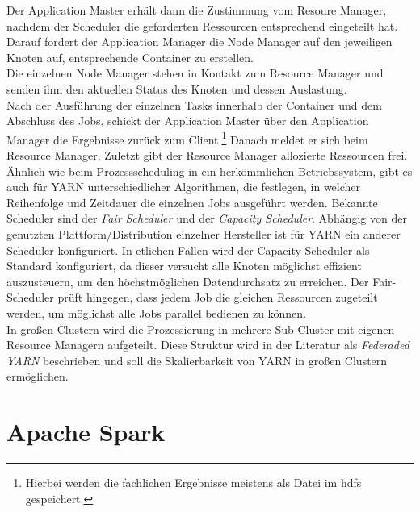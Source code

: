 \noindent
Der Application Master erhält dann die Zustimmung vom Resoure Manager, nachdem der Scheduler die geforderten Ressourcen entsprechend eingeteilt hat. Darauf fordert der Application Manager die Node Manager auf den jeweiligen Knoten auf, entsprechende Container zu erstellen.\\
Die einzelnen Node Manager stehen in Kontakt zum Resource Manager und senden ihm den aktuellen Status des Knoten und dessen Auslastung. \\
Nach der Ausführung der einzelnen Tasks innerhalb der Container und dem Abschluss des Jobs, schickt der Application Master über den Application Manager die Ergebnisse zurück zum Client.\footnote{Hierbei werden die fachlichen Ergebnisse meistens als Datei im \gls{hdfs} gespeichert.} Danach meldet er sich beim Resource Manager. Zuletzt gibt der Resource Manager allozierte Ressourcen frei.\\


\noindent
Ähnlich wie beim Prozessscheduling in ein herkömmlichen Betriebssystem, gibt es auch für YARN unterschiedlicher Algorithmen, die festlegen, in welcher Reihenfolge und Zeitdauer die einzelnen Jobs ausgeführt werden. Bekannte Scheduler sind der \textit{Fair Scheduler} und der \textit{Capacity Scheduler}. Abhängig von der genutzten Plattform/Distribution einzelner Hersteller ist für YARN ein anderer Scheduler konfiguriert. In etlichen Fällen wird der Capacity Scheduler als Standard konfiguriert, da dieser versucht alle Knoten möglichst effizient auszusteuern, um den höchstmöglichen Datendurchsatz zu erreichen. Der Fair-Scheduler prüft hingegen, dass jedem Job die gleichen Ressourcen zugeteilt werden, um möglichst alle Jobs parallel bedienen zu können.\\

\noindent
In großen Clustern wird die Prozessierung in mehrere Sub-Cluster mit eigenen Resource Managern aufgeteilt. Diese Struktur wird in der Literatur als \textit{Federaded YARN} beschrieben und soll die Skalierbarkeit von YARN in großen Clustern ermöglichen.

\section{Apache Spark}
\label{sec:theory_spark}


